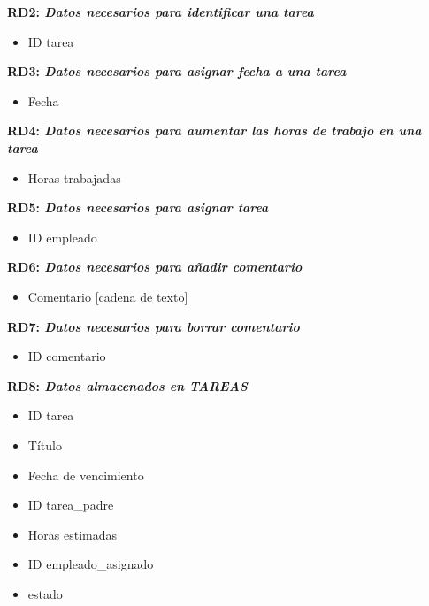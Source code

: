 \documentclass[paper=a4, fontsize=11pt, spanish]{scrartcl}
\begin{document}
\setlength{\parindent}{0em}
\textbf{RD2: \textit{Datos necesarios para identificar una tarea}}
\setlength{\parindent}{2em}
\begin{itemize}
\item ID tarea
\end{itemize}

\setlength{\parindent}{0em}
\textbf{RD3: \textit{Datos necesarios para asignar fecha a una tarea}}
\setlength{\parindent}{2em}
\begin{itemize}
\item Fecha
\end{itemize}

\setlength{\parindent}{0em}
\textbf{RD4: \textit{Datos necesarios para aumentar las horas de trabajo en una tarea}}
\setlength{\parindent}{2em}
\begin{itemize}
\item Horas trabajadas
\end{itemize}

\setlength{\parindent}{0em}
\textbf{RD5: \textit{Datos necesarios para asignar tarea}}
\setlength{\parindent}{2em}
\begin{itemize}
\item ID empleado
\end{itemize}

\setlength{\parindent}{0em}
\textbf{RD6: \textit{Datos necesarios para añadir comentario}}
\setlength{\parindent}{2em}
\begin{itemize}
\item Comentario [cadena de texto]
\end{itemize}

\setlength{\parindent}{0em}
\textbf{RD7: \textit{Datos necesarios para borrar comentario}}
\setlength{\parindent}{2em}
\begin{itemize}
\item ID comentario
\end{itemize}

\setlength{\parindent}{0em}
\textbf{RD8: \textit{Datos almacenados en TAREAS}}
\setlength{\parindent}{2em}
\begin{itemize}
\item ID tarea
\item Título
\item Fecha de vencimiento
\item ID tarea\_padre
\item Horas estimadas
\item ID empleado\_asignado
\item estado
\end{itemize}
\end{document}
